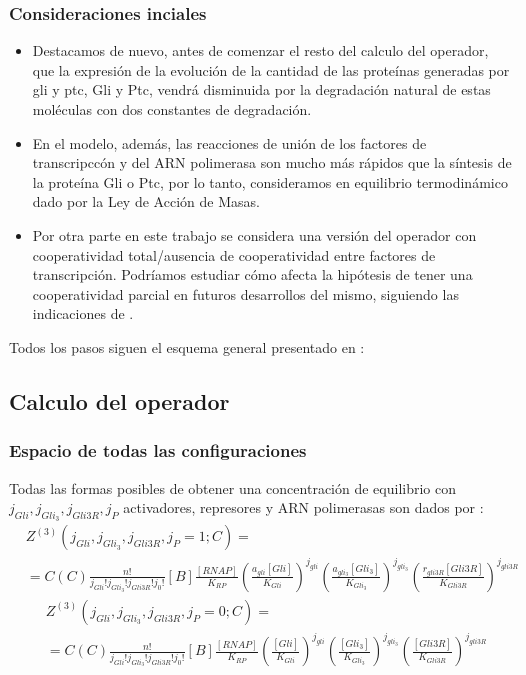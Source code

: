 \subsubsection{Consideraciones inciales}
\begin{itemize}

\item Destacamos de nuevo, antes de comenzar el resto del calculo del operador, que la expresión de la evolución de la cantidad de las proteínas generadas por gli y ptc, Gli y Ptc, vendrá disminuida por la degradación natural de estas moléculas con dos constantes de degradación.

\item En el modelo, además, las reacciones de unión de los factores de transcripccón y del ARN polimerasa son mucho más rápidos que la síntesis de la proteína Gli o Ptc, por lo tanto, consideramos en equilibrio termodinámico dado por la Ley de Acción de Masas.

\item Por otra parte en este trabajo se considera una versión del operador con cooperatividad total/ausencia de cooperatividad entre factores de transcripción. Podríamos estudiar cómo afecta la hipótesis de tener una cooperatividad parcial en futuros desarrollos del mismo, siguiendo las indicaciones de \cite{cambon1}.
	 
\end{itemize}
Todos los pasos siguen el esquema general presentado en \cite{cambon1}:
\subsection{Calculo del operador}
\subsubsection{Espacio de todas las configuraciones}
Todas las formas posibles de obtener una concentración de equilibrio con $j_{Gli}, j_{Gli_3}, j_{Gli3R},j_P$ activadores, represores y ARN polimerasas son dados por :
\begin{equation}
\begin{split}
&Z^{(3)}(j_{Gli}, j_{Gli_3}, j_{Gli3R},j_P=1;C)=\\&=\textit{C}(C)\frac{n!}{j_{Gli}! j_{Gli_3}! j_{Gli3R}!j_0!}[B]\frac{[RNAP]}{K_{RP}}
(\frac{a_{gli}[Gli]}{K_{Gli}})^{j_{gli}}
(\frac{a_{gli_3}[Gli_3]}{K_{Gli_3}})^{j_{gli_3}}
(\frac{r_{gli3R}[Gli3R]}{K_{Gli3R}})^{j_{gli3R}}
\end{split}
\end{equation}
\begin{equation}
\begin{split}
&Z^{(3)}(j_{Gli}, j_{Gli_3}, j_{Gli3R},j_P=0;C)=\\&=\textit{C}(C)\frac{n!}{j_{Gli}! j_{Gli_3}! j_{Gli3R}!j_0!}[B]\frac{[RNAP]}{K_{RP}}
(\frac{[Gli]}{K_{Gli}})^{j_{gli}}
(\frac{[Gli_3]}{K_{Gli_3}})^{j_{gli_3}}
(\frac{[Gli3R]}{K_{Gli3R}})^{j_{gli3R}}
\end{split}
\end{equation}

